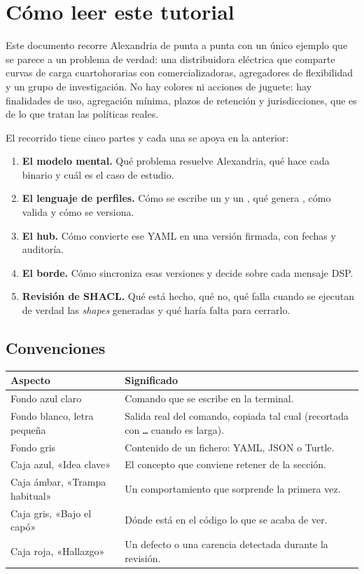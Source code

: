 \chapter*{Cómo leer este tutorial}

Este documento recorre Alexandria de punta a punta con un único ejemplo que se parece a un problema de
verdad: una distribuidora eléctrica que comparte curvas de carga cuartohorarias con comercializadoras,
agregadores de flexibilidad y un grupo de investigación. No hay colores ni acciones de juguete: hay finalidades
de uso, agregación mínima, plazos de retención y jurisdicciones, que es de lo que tratan las políticas reales.

El recorrido tiene cinco partes y cada una se apoya en la anterior:

\begin{enumerate}[leftmargin=*, itemsep=2pt]
  \item \textbf{El modelo mental.} Qué problema resuelve Alexandria, qué hace cada binario y cuál es el caso de estudio.
  \item \textbf{El lenguaje de perfiles.} Cómo se escribe un  y un , qué genera
        , cómo valida y cómo se versiona.
  \item \textbf{El hub.} Cómo  convierte ese YAML en una versión firmada, con fechas y auditoría.
  \item \textbf{El borde.} Cómo  sincroniza esas versiones y decide sobre cada mensaje DSP.
  \item \textbf{Revisión de SHACL.} Qué está hecho, qué no, qué falla cuando se ejecutan de verdad las \emph{shapes}
        generadas y qué haría falta para cerrarlo.
\end{enumerate}

\section*{Convenciones}

\noindent\begin{tabularx}{\linewidth}{@{}L{3.6cm}Y@{}}
\toprule
\textbf{Aspecto} & \textbf{Significado} \\
\midrule
Fondo azul claro & Comando que se escribe en la terminal. \\
Fondo blanco, letra pequeña & Salida real del comando, copiada tal cual (recortada con \texttt{…} cuando es larga). \\
Fondo gris & Contenido de un fichero: YAML, JSON o Turtle. \\
Caja azul, «Idea clave» & El concepto que conviene retener de la sección. \\
Caja ámbar, «Trampa habitual» & Un comportamiento que sorprende la primera vez. \\
Caja gris, «Bajo el capó» & Dónde está en el código lo que se acaba de ver. \\
Caja roja, «Hallazgo» & Un defecto o una carencia detectada durante la revisión. \\
\bottomrule
\end{tabularx}

